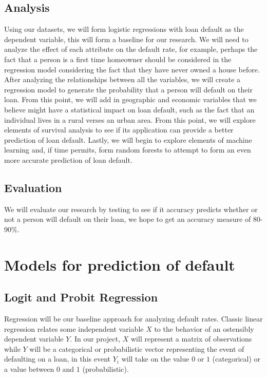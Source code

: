\documentclass[sigconf, 11pt]{acmart}
\begin{document}
\subsection{Analysis}
Using our datasets, we will form logistic regressions with loan default as the dependent variable, this will form a baseline for our research. We will need to analyze the effect of each attribute on the default rate, for example, perhaps the fact that a person is a first time homeowner should be considered in the regression model considering the fact that they have never owned a house before. After analyzing the relationships between all the variables, we will create a regression model to generate the probability that a person will default on their loan. From this point, we will add in geographic and economic variables that we believe might have a statistical impact on loan default, such as the fact that an individual lives in a rural verses an urban area. From this point, we will explore elements of survival analysis to see if its application can provide a better prediction of loan default. Lastly, we will begin to explore elements of machine learning and, if time permits, form random forests to attempt to form an even more accurate prediction of loan default.

\subsection{Evaluation}
We will evaluate our research by testing to see if it accuracy predicts whether or not a person will default on their loan, we hope to get an accuracy measure of 80-90\%.

\section{Models for prediction of default}
\subsection{Logit and Probit Regression}
Regression will be our baseline approach for analyzing default rates. Classic linear regression relates some independent variable $X$ to the behavior of an ostensibly dependent variable $Y$. In our project, $X$ will represent a matrix of observations while $Y$ will be a categorical or probabilistic vector representing the event of defaulting on a loan, in this event $Y_i$ will take on the value $0$ or $1$ (categorical) or a value between $0$ and $1$ (probabilistic).
\end{document}
